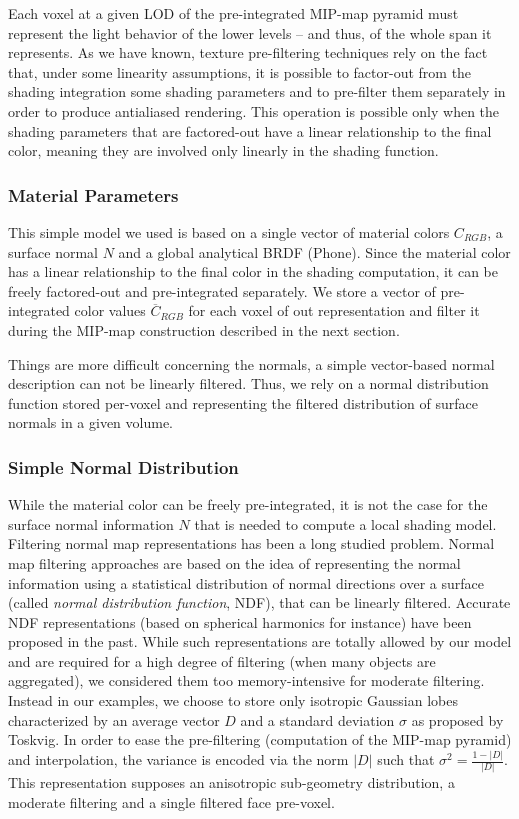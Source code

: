 Each voxel at a given LOD of the pre-integrated MIP-map pyramid must represent the light behavior of the lower levels -- and thus, of the whole span it represents. As we have known, texture pre-filtering techniques rely on the fact that, under some linearity assumptions, it is possible to factor-out from the shading integration some shading parameters and to pre-filter them separately in order to produce antialiased rendering. This operation is possible only when the shading parameters that are factored-out have a linear relationship to the final color, meaning they are involved only linearly in the shading function.



\subsubsection{Material Parameters}
This simple model we used is based on a single vector of material colors $C_{RGB}$, a surface normal $N$ and a global analytical BRDF (Phone). Since the material color has a linear relationship to the final color in the shading computation, it can be freely factored-out and pre-integrated separately. We store a vector of pre-integrated color values $\overline{C}_{RGB}$ for each voxel of out representation and filter it during the MIP-map construction described in the next section. 

Things are more difficult concerning the normals, a simple vector-based normal description can not be linearly filtered. Thus, we rely on a normal distribution function stored per-voxel and representing the filtered distribution of surface normals in a given volume.



\subsubsection{Simple Normal Distribution}
While the material color can be freely pre-integrated, it is not the case for the surface normal information $N$ that is needed to compute a local shading model. Filtering normal map representations has been a long studied problem. Normal map filtering approaches are based on the idea of representing the normal information using a statistical distribution of normal directions over a surface (called \textit{normal distribution function}, NDF), that can be linearly filtered. Accurate NDF representations (based on spherical harmonics for instance) have been proposed in the past. While such representations are totally allowed by our model and are required for a high degree of filtering (when many objects are aggregated), we considered them too memory-intensive for moderate filtering. Instead in our examples, we choose to store only isotropic Gaussian lobes characterized by an average vector $D$ and a standard deviation $\sigma$ as proposed by Toskvig\cite{a:Mipmappingnormalmaps}. In order to ease the pre-filtering (computation of the MIP-map pyramid) and interpolation, the variance is encoded via the norm $|D|$ such that $\sigma^{2}=\frac{1-|D|}{|D|}$. This representation supposes an anisotropic sub-geometry distribution, a moderate filtering and a single filtered face pre-voxel.



